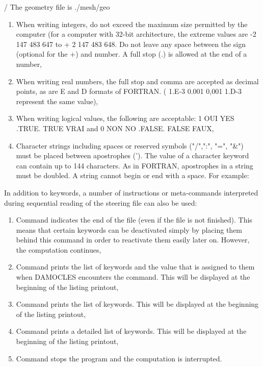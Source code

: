  / The geometry file is ./mesh/geo

\begin{enumerate}
\item  When writing integers, do not exceed the maximum size permitted by the computer (for a computer with 32-bit architecture, the extreme values are -2 147 483 647 to + 2 147 483 648. Do not leave any space between the sign (optional for the +) and number. A full stop (.) is allowed at the end of a number,

\item  When writing real numbers, the full stop and comma are accepted as decimal points, as are E and D formats of FORTRAN. ( 1.E-3  0.001  0,001  1.D-3 represent the same value),

\item  When writing logical values, the following are acceptable: 1 OUI  YES  .TRUE.  TRUE  VRAI and 0 NON  NO  .FALSE.  FALSE  FAUX,

\item  Character strings including spaces or reserved symbols ("/",":", "=", "\&") must be placed between apostrophes ('). The value of a character keyword can contain up to 144 characters. As in FORTRAN, apostrophes in a string must be doubled. A string cannot begin or end with a space. For example:
\end{enumerate}


 \telkey{}

 \telkey{}

 In addition to keywords, a number of instructions or meta-commands interpreted during sequential reading of the steering file can also be used:

\begin{enumerate}
\item  Command  indicates the end of the file (even if the file is not finished). This means that certain keywords can be deactivated simply by placing them behind this command in order to reactivate them easily later on. However, the computation continues,

\item  Command  prints the list of keywords and the value that is assigned to them when DAMOCLES encounters the command. This will be displayed at the beginning of the listing printout,

\item  Command  prints the list of keywords. This will be displayed at the beginning of the listing printout,

\item  Command  prints a detailed list of keywords. This will be displayed at the beginning of the listing printout,

\item  Command  stops the program and the computation is interrupted.
\end{enumerate}


